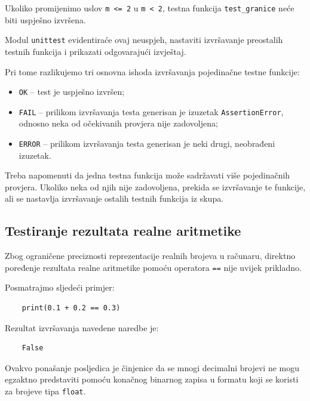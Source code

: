 Ukoliko promijenimo uslov \texttt{m <= 2} u 
\texttt{m < 2}, testna funkcija 
\texttt{test\_granice} neće biti uspješno izvršena.

Modul \texttt{unittest} evidentiraće ovaj neuspjeh, 
nastaviti izvršavanje preostalih testnih funkcija 
i prikazati odgovarajući izvještaj.

Pri tome razlikujemo tri osnovna ishoda izvršavanja 
pojedinačne testne funkcije:

\begin{itemize}
	\item \texttt{OK} -- test je uspješno izvršen;
	
	\item \texttt{FAIL} -- prilikom izvršavanja testa 
	generisan je izuzetak \texttt{AssertionError}, 
	odnosno neka od očekivanih provjera nije 
	zadovoljena;
	
	\item \texttt{ERROR} -- prilikom izvršavanja testa 
	generisan je neki drugi, neobrađeni izuzetak.
\end{itemize}

Treba napomenuti da jedna testna funkcija može 
sadržavati više pojedinačnih provjera. Ukoliko neka 
od njih nije zadovoljena, prekida se izvršavanje 
te funkcije, ali se nastavlja izvršavanje ostalih 
testnih funkcija iz skupa.


\subsection{Testiranje rezultata realne aritmetike}

Zbog ograničene preciznosti reprezentacije realnih 
brojeva u računaru, direktno poređenje rezultata 
realne aritmetike pomoću operatora \texttt{==} 
nije uvijek prikladno.

Posmatrajmo sljedeći primjer:

\begin{verbatim}
	print(0.1 + 0.2 == 0.3)
\end{verbatim}

Rezultat izvršavanja navedene naredbe je:

\begin{verbatim}
	False
\end{verbatim}

Ovakvo ponašanje posljedica je činjenice da se mnogi 
decimalni brojevi ne mogu egzaktno predstaviti 
pomoću konačnog binarnog zapisa u formatu koji se 
koristi za brojeve tipa \texttt{float}.

